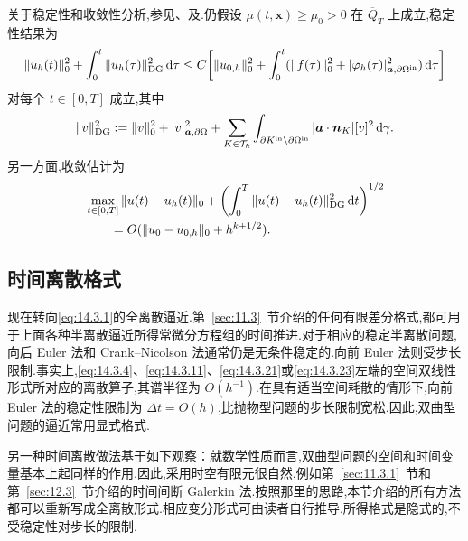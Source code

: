 关于稳定性和收敛性分析,参见、及.仍假设 \(\mu(t,\boldsymbol{x})\ge\mu_0>0\) 在 \(\overline Q_T\) 上成立,稳定性结果为
\begin{equation}\label{eq:14.3.24}
  \begin{aligned}
    \|u_h(t)\|_0^2+\int_0^t\|u_h(\tau)\|_{\rm DG}^2\,\mathrm d\tau
     \le C\biggl[\|u_{0,h}\|_0^2
        +\int_0^t(\|f(\tau)\|_0^2
               +|\varphi_h(\tau)|_{\boldsymbol{a},\partial\Omega^{\rm in}}^2)\,\mathrm d\tau\biggr]
  \end{aligned}
\end{equation}
对每个 \(t\in[0,T]\) 成立,其中
\[
  \|v\|_{\rm DG}^2:=\|v\|_0^2+|v|_{\boldsymbol{a},\partial\Omega}^2
    +\sum_{K\in\mathcal T_h}\int_{\partial K^{\rm in}\setminus\partial\Omega^{\rm in}}
             |\boldsymbol{a}\cdot\boldsymbol{n}_K|[v]^2\,\mathrm d\gamma.
\]
另一方面,收敛估计为
\begin{equation}\label{eq:14.3.25}
  \begin{aligned}
    &\max_{t\in[0,T]}\|u(t)-u_h(t)\|_0
          +\biggl(\int_0^T\|u(t)-u_h(t)\|_{\rm DG}^2\,\mathrm dt\biggr)^{1/2}\\
    &\qquad=O(\|u_0-u_{0,h}\|_0+h^{k+1/2}).
  \end{aligned}
\end{equation}

\subsection{时间离散格式}\label{sec:14.3.4}

现在转向\eqref{eq:14.3.1}的全离散逼近.第~\ref{sec:11.3}~节介绍的任何有限差分格式,都可用于上面各种半离散逼近所得常微分方程组的时间推进.对于相应的稳定半离散问题,向后 Euler 法和 Crank--Nicolson 法通常仍是无条件稳定的.向前 Euler 法则受步长限制.事实上,\eqref{eq:14.3.4}、\eqref{eq:14.3.11}、\eqref{eq:14.3.21}或\eqref{eq:14.3.23}左端的空间双线性形式所对应的离散算子,其谱半径为 \(O(h^{-1})\).在具有适当空间耗散的情形下,向前 Euler 法的稳定性限制为 \(\Delta t=O(h)\),比抛物型问题的步长限制宽松.因此,双曲型问题的逼近常用显式格式.

另一种时间离散做法基于如下观察：就数学性质而言,双曲型问题的空间和时间变量基本上起同样的作用.因此,采用时空有限元很自然,例如第~\ref{sec:11.3.1}~节和第~\ref{sec:12.3}~节介绍的时间间断 Galerkin 法.按照那里的思路,本节介绍的所有方法都可以重新写成全离散形式.相应变分形式可由读者自行推导.所得格式是隐式的,不受稳定性对步长的限制.

